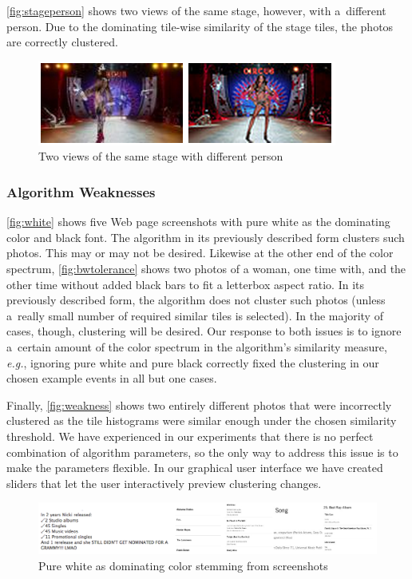 \autoref{fig:stageperson} shows two views of the same stage,
however, with a~different person.
Due to the dominating tile-wise similarity of the stage tiles,
the photos are correctly clustered.

\begin{figure}[h!]
  \centering
  \includegraphics[width=0.6\linewidth]{./stage.png}
  \caption{Two views of the same stage with different person}
  \label{fig:stageperson}
\end{figure}

\subsubsection{Algorithm Weaknesses}

\autoref{fig:white} shows five Web page screenshots with pure white
as the dominating color and black font.
The algorithm in its previously described form clusters such photos.
This may or may not be desired.
Likewise at the other end of the color spectrum,
\autoref{fig:bwtolerance} shows two photos of a woman,
one time with, and the other time without added black bars
to fit a letterbox aspect ratio.
In its previously described form, the algorithm
does not cluster such photos (unless a~really small number
of required similar tiles is selected).
In the majority of cases, though, clustering will be desired.
Our response to both issues is to ignore a~certain amount
of the color spectrum in the algorithm's similarity measure,
\emph{e.g.}, ignoring pure white and pure black correctly fixed
the clustering in our chosen example events in all but one cases.

Finally, \autoref{fig:weakness} shows two entirely different photos
that were incorrectly clustered as the tile histograms
were similar enough under the chosen similarity threshold.
We have experienced in our experiments that there is no perfect
combination of algorithm parameters,
so the only way to address this issue is to make the parameters flexible.
In our graphical user interface we have created sliders
that let the user interactively preview clustering changes. 

\begin{figure}[h!]
  \centering
  \includegraphics[width=0.8\linewidth]{./white.png}
  \caption{Pure white as dominating color stemming from screenshots}
  \label{fig:white}
\end{figure}

